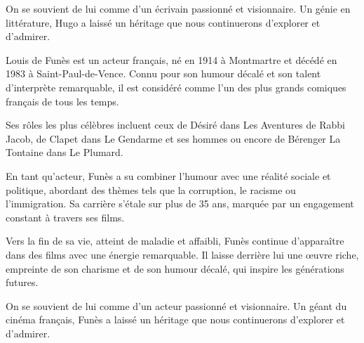 \documentclass{article}
\begin{document}
On se souvient de lui comme d'un écrivain passionné et visionnaire. Un génie en littérature, Hugo a laissé un héritage que nous continuerons d'explorer et d'admirer.

Louis de Funès est un acteur français, né en 1914 à Montmartre et décédé en 1983 à Saint-Paul-de-Vence. Connu pour son humour décalé et son talent d'interprète remarquable, il est considéré comme l'un des plus grands comiques français de tous les temps.

   Ses rôles les plus célèbres incluent ceux de Désiré dans Les Aventures de Rabbi Jacob, de Clapet dans Le Gendarme et ses hommes ou encore de Bérenger La Tontaine dans Le Plumard.

   En tant qu'acteur, Funès a su combiner l'humour avec une réalité sociale et politique, abordant des thèmes tels que la corruption, le racisme ou l'immigration. Sa carrière s'étale sur plus de 35 ans, marquée par un engagement constant à travers ses films.

   Vers la fin de sa vie, atteint de maladie et affaibli, Funès continue d'apparaître dans des films avec une énergie remarquable. Il laisse derrière lui une œuvre riche, empreinte de son charisme et de son humour décalé, qui inspire les générations futures.

   On se souvient de lui comme d'un acteur passionné et visionnaire. Un géant du cinéma français, Funès a laissé un héritage que nous continuerons d'explorer et d'admirer.
\end{document}
